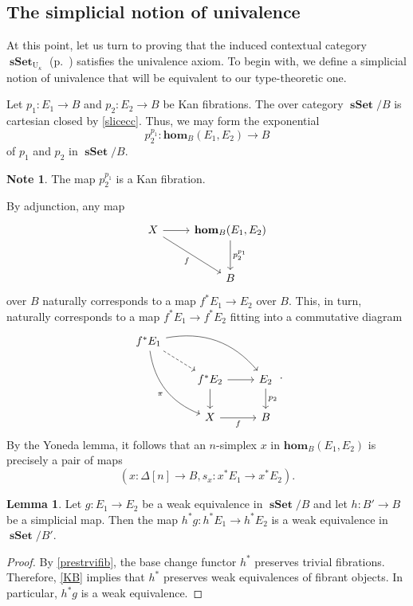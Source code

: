 \documentclass[10pt,letterpaper,cm]{nupset}
\theoremstyle{definition}
\newtheorem{note}[definition]{Note}
\theoremstyle{theorem}
\newtheorem{lemma}[definition]{Lemma}
\theoremstyle{remark}
\newcommand{\0}{\mathbf{0}}
\newcommand{\1}{\mathbf{1}}
\newcommand{\2}{\mathbf{2}}
\DeclareMathOperator{\sset}{\mathbf{sSet}}
\begin{document}
\subsection{The simplicial notion of univalence}\label{suniv}

At this point, let us turn to proving that the induced contextual category $\sset_{\mathrm{U}_{\kappa}}$ (p.~\pageref{indcxtcat}) satisfies the univalence axiom. To begin with, we define a simplicial notion of univalence that will be equivalent to our type-theoretic one.

\bigskip

Let $p_1 : E_1\to B$ and $p_2 : E_2 \to B$ be Kan fibrations. The over category $\sset/B$ is cartesian closed by \cref{slicecc}. Thus, we may form the exponential $$p_2^{p_1}: \mathbf{hom}_B(E_1, E_2) \to B$$ of $p_1$ and $p_2$ in $\sset/B$. 

\begin{note}
The map $p_2^{p_1}$ is a Kan fibration.
\end{note}

\smallskip

By adjunction, any map 
\[
\begin{tikzcd}[row sep=large]
X \arrow[rd, "f"'] \arrow[r] & {\mathbf{hom}_B(E_1, E_2)} \arrow[d, "p_2^{p_1}"] \\
                             & B                                                
\end{tikzcd}
\] over $B$ naturally corresponds to a map $f^{\ast}{E_1} \to E_2$ over $B$. This, in turn, naturally corresponds to a map $f^{\ast}{E_1} \to f^{\ast}{E_2}$ fitting into a commutative diagram
\[
\begin{tikzcd}
f^{\ast}{E_1} \arrow[rrd, bend left] \arrow[rdd, "\pi"', bend right] \arrow[rd, dashed] &                                   &                      \\
                                                                                        & f^{\ast}{E_2} \arrow[d] \arrow[r] & E_2 \arrow[d, "p_2"] \\
                                                                                        & X \arrow[r, "f"']                 & B                   
\end{tikzcd}
.\] By the Yoneda lemma, it follows that an $n$-simplex $x$ in $\mathbf{hom}_B(E_1, E_2)$ is precisely a pair  of maps $$\left(x: \Delta[n]\to B, s_x : x^{\ast}{E_1} \to x^{\ast}{E_2}\right).$$

\begin{lemma}\label{alsowe}
Let $g : E_1 \to E_2$ be a weak equivalence in $\sset/B$ and let $h: B' \to B$ be a simplicial map. Then the map $ h^{\ast}{g}: h^{\ast}{E_1} \to h^{\ast}{E_2}$ is a weak equivalence in $\sset/B'$.
\end{lemma}
\begin{proof}
By \cref{prestrvifib}, the base change functor $h^{\ast}$ preserves trivial fibrations. Therefore, \cref{KB} implies that $h^{\ast}$ preserves weak equivalences of fibrant objects. In particular, $h^{\ast}{g}$ is a weak equivalence.
\end{proof}
\end{document}
